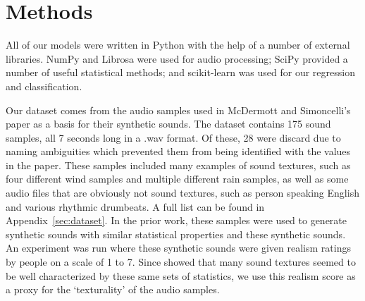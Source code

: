 \documentclass{sig-alternate-05-2015}
\begin{document}
\subsection{}

\section{Methods}
\label{sec:methods}

All of our models were written in Python with the help of a number of external libraries. NumPy\cite{numpy} and Librosa\cite{mcfee2015librosa} were used for audio processing; SciPy\cite{scipy} provided a number of useful statistical methods; and scikit-learn\cite{scikit-learn} was used for our regression and classification.

Our dataset comes from the audio samples used in McDermott and Simoncelli's paper\cite{McDermott2011926} as a basis for their synthetic sounds. The dataset contains 175 sound samples, all 7 seconds long in a .wav format. Of these, 28 were discard due to naming ambiguities which prevented them from being identified with the values in the paper. These samples included many examples of sound textures, such as four different wind samples and multiple different rain samples, as well as some audio files that are obviously not sound textures, such as person speaking English and various rhythmic drumbeats. A full list can be found in Appendix~\ref{sec:dataset}. In the prior work, these samples were used to generate synthetic sounds with similar statistical properties and these synthetic sounds. An experiment was run where these synthetic sounds were given realism ratings by people on a scale of 1 to 7. Since \cite{mcdermott2013summary} showed that many sound textures seemed to be well characterized by these same sets of statistics, we use this realism score as a proxy for the `texturality' of the audio samples.
\end{document}
